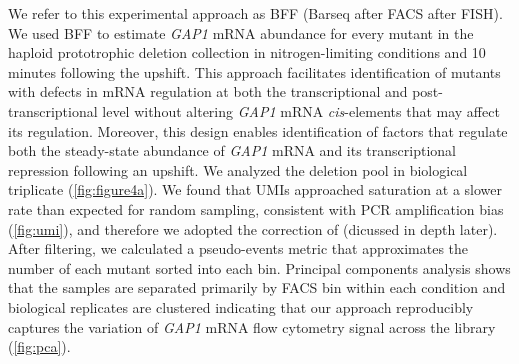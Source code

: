 We refer to this experimental approach as BFF (Barseq after FACS after FISH). 
We used BFF to estimate \textit{GAP1} mRNA abundance for every mutant in the
haploid prototrophic deletion collection
\parencite{vandersluis2014broad} in
nitrogen-limiting conditions and 10 minutes following the upshift. 
This approach facilitates identification of mutants with
defects in mRNA regulation at both the transcriptional and
post-transcriptional level without altering \textit{GAP1} mRNA 
\textit{cis}-elements that may affect its regulation. 
Moreover, this design enables identification of factors that 
regulate both the steady-state abundance of \textit{GAP1} mRNA and 
its transcriptional repression following an upshift.
We analyzed the deletion pool in biological triplicate
(\autoref{fig:figure4a}). We found that UMIs 
approached saturation at a slower rate than expected for random sampling,
consistent with PCR amplification bias 
(\autoref{fig:umi}), and therefore we adopted the 
correction of \cite{fu2011counting} (dicussed in depth later). 
After filtering, we calculated a
pseudo-events metric that approximates the number of each mutant sorted
into each bin. 
Principal components analysis shows that the samples are 
separated primarily by FACS bin within each
condition and biological replicates are clustered indicating that our
approach reproducibly captures the variation of  \textit{GAP1} mRNA flow
cytometry signal across the library (\autoref{fig:pca}). 


